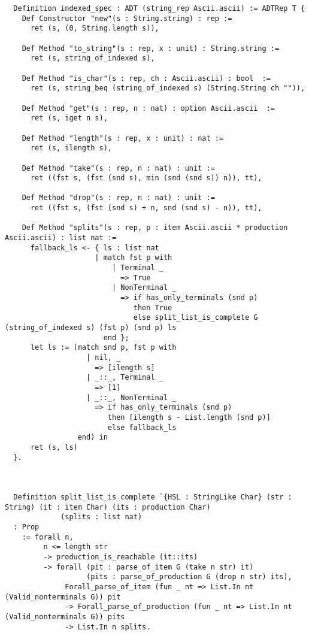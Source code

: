 \begin{verbatim}
  Definition indexed_spec : ADT (string_rep Ascii.ascii) := ADTRep T {
    Def Constructor "new"(s : String.string) : rep :=
      ret (s, (0, String.length s)),

    Def Method "to_string"(s : rep, x : unit) : String.string :=
      ret (s, string_of_indexed s),

    Def Method "is_char"(s : rep, ch : Ascii.ascii) : bool  :=
      ret (s, string_beq (string_of_indexed s) (String.String ch "")),

    Def Method "get"(s : rep, n : nat) : option Ascii.ascii  :=
      ret (s, iget n s),

    Def Method "length"(s : rep, x : unit) : nat :=
      ret (s, ilength s),

    Def Method "take"(s : rep, n : nat) : unit :=
      ret ((fst s, (fst (snd s), min (snd (snd s)) n)), tt),

    Def Method "drop"(s : rep, n : nat) : unit :=
      ret ((fst s, (fst (snd s) + n, snd (snd s) - n)), tt),

    Def Method "splits"(s : rep, p : item Ascii.ascii * production Ascii.ascii) : list nat :=
      fallback_ls <- { ls : list nat
                     | match fst p with
                         | Terminal _
                           => True
                         | NonTerminal _
                           => if has_only_terminals (snd p)
                              then True
                              else split_list_is_complete G (string_of_indexed s) (fst p) (snd p) ls
                       end };
      let ls := (match snd p, fst p with
                   | nil, _
                     => [ilength s]
                   | _::_, Terminal _
                     => [1]
                   | _::_, NonTerminal _
                     => if has_only_terminals (snd p)
                        then [ilength s - List.length (snd p)]
                        else fallback_ls
                 end) in
      ret (s, ls)
  }.



  Definition split_list_is_complete `{HSL : StringLike Char} (str : String) (it : item Char) (its : production Char)
             (splits : list nat)
  : Prop
    := forall n,
         n <= length str
         -> production_is_reachable (it::its)
         -> forall (pit : parse_of_item G (take n str) it)
                   (pits : parse_of_production G (drop n str) its),
              Forall_parse_of_item (fun _ nt => List.In nt (Valid_nonterminals G)) pit
              -> Forall_parse_of_production (fun _ nt => List.In nt (Valid_nonterminals G)) pits
              -> List.In n splits.

\end{verbatim}



